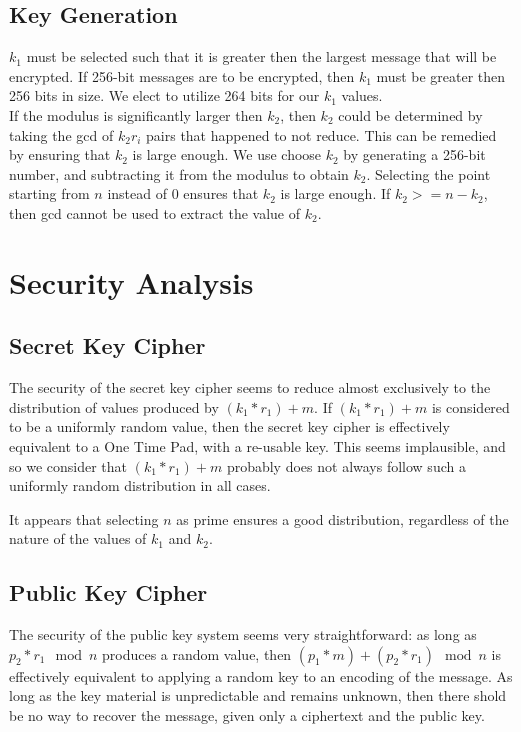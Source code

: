 \documentclass[preprint]{iacrtrans}
\begin{document}
\subsection{Key Generation}
$k_1$ must be selected such that it is greater then the largest message that will be encrypted. If 256-bit messages are to be encrypted, then $k_1$ must be greater then 256 bits in size. We elect to utilize 264 bits for our $k_1$ values. \\

If the modulus is significantly larger then $k_2$, then $k_2$ could be determined by taking the gcd of $k_2 r_i$ pairs that happened to not reduce. This can be remedied by ensuring that $k_2$ is large enough. We use choose $k_2$ by generating a 256-bit number, and subtracting it from the modulus to obtain $k_2$. Selecting the point starting from $n$ instead of $0$ ensures that $k_2$ is large enough. If $k_2 >= n - k_2$, then gcd cannot be used to extract the value of $k_2$.

\section{Security Analysis}
\subsection{Secret Key Cipher}
The security of the secret key cipher seems to reduce almost exclusively to the distribution of values produced by $(k_1 * r_1) + m$. If $(k_1 * r_1) + m$ is considered to be a uniformly random value, then the secret key cipher is effectively equivalent to a One Time Pad, with a re-usable key. This seems implausible, and so we consider that $(k_1 * r_1) + m$  probably does not always follow such a uniformly random distribution in all cases. 

It appears that selecting $n$ as prime ensures a good distribution, regardless of the nature of the values of $k_1$ and $k_2$.\\

\subsection{Public Key Cipher}
The security of the public key system seems very straightforward: as long as $p_2 * r_1 \mod n$ produces a random value, then $(p_1 * m) + (p_2 * r_1) \mod n$ is effectively equivalent to applying a random key to an encoding of the message. As long as the key material is unpredictable and remains unknown, then there shold be no way to recover the message, given only a ciphertext and the public key. 
\end{document}
